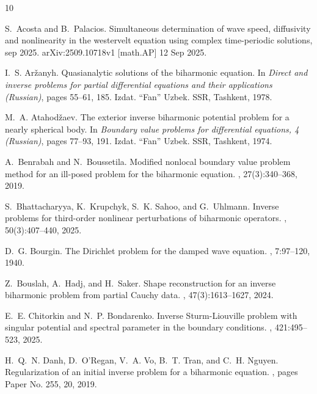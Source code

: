 \documentclass[12pt,reqno]{amsart}
\numberwithin{equation}{section}
\begin{document}
\begin{thebibliography}{10}

S.~Acosta and B.~Palacios.
\newblock Simultaneous determination of wave speed, diffusivity and
  nonlinearity in the westervelt equation using complex time-periodic
  solutions, sep 2025.
\newblock arXiv:2509.10718v1 [math.AP] 12 Sep 2025.

I.~S. Ar\v{z}anyh.
\newblock Quasianalytic solutions of the biharmonic equation.
\newblock In {\em Direct and inverse problems for partial differential
  equations and their applications ({R}ussian)}, pages 55--61, 185. Izdat.
  ``Fan'' Uzbek. SSR, Tashkent, 1978.

M.~A. Atahod\v{z}aev.
\newblock The exterior inverse biharmonic potential problem for a nearly
  spherical body.
\newblock In {\em Boundary value problems for differential equations, 4
  ({R}ussian)}, pages 77--93, 191. Izdat. ``Fan'' Uzbek. SSR, Tashkent, 1974.

A.~Benrabah and N.~Boussetila.
\newblock Modified nonlocal boundary value problem method for an ill-posed
  problem for the biharmonic equation.
, 27(3):340--368, 2019.

S.~Bhattacharyya, K.~Krupchyk, S.~K. Sahoo, and G.~Uhlmann.
\newblock Inverse problems for third-order nonlinear perturbations of
  biharmonic operators.
, 50(3):407--440, 2025.

D.~G. Bourgin.
\newblock The {D}irichlet problem for the damped wave equation.
, 7:97--120, 1940.

Z.~Bouslah, A.~Hadj, and H.~Saker.
\newblock Shape reconstruction for an inverse biharmonic problem from partial
  {C}auchy data.
, 47(3):1613--1627, 2024.

E.~E. Chitorkin and N.~P. Bondarenko.
\newblock Inverse {S}turm-{L}iouville problem with singular potential and
  spectral parameter in the boundary conditions.
, 421:495--523, 2025.

H.~Q.~N. Danh, D.~O'Regan, V.~A. Vo, B.~T. Tran, and C.~H. Nguyen.
\newblock Regularization of an initial inverse problem for a biharmonic
  equation.
, pages Paper No. 255, 20, 2019.


\end{thebibliography}
\end{document}
